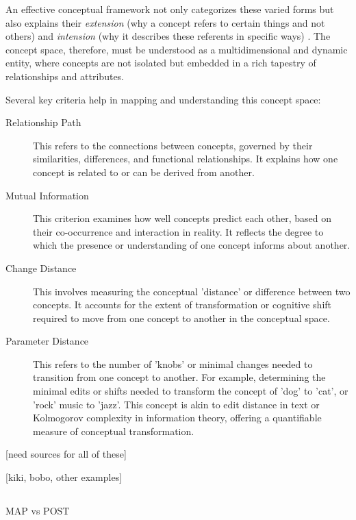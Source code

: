 An effective conceptual framework not only categorizes these varied forms but also explains their \emph{extension} (why a concept refers to certain things and not others) and \emph{intension} (why it describes these referents in specific ways) \cite{ball2013surfaces}. The concept space, therefore, must be understood as a multidimensional and dynamic entity, where concepts are not isolated but embedded in a rich tapestry of relationships and attributes.

Several key criteria help in mapping and understanding this concept space:

\begin{description}
    \item [Relationship Path] This refers to the connections between concepts, governed by their similarities, differences, and functional relationships. It explains how one concept is related to or can be derived from another.
    \item [Mutual Information] This criterion examines how well concepts predict each other, based on their co-occurrence and interaction in reality. It reflects the degree to which the presence or understanding of one concept informs about another.
    \item [Change Distance] This involves measuring the conceptual 'distance' or difference between two concepts. It accounts for the extent of transformation or cognitive shift required to move from one concept to another in the conceptual space.
    \item [Parameter Distance] This refers to the number of 'knobs' or minimal changes needed to transition from one concept to another. For example, determining the minimal edits or shifts needed to transform the concept of 'dog' to 'cat', or 'rock' music to 'jazz'. This concept is akin to edit distance in text or Kolmogorov complexity in information theory, offering a quantifiable measure of conceptual transformation.
\end{description}
[need sources for all of these]

[kiki, bobo, other examples]


\subsection{}
MAP vs POST


\subsection{}\label{sec:llm}

